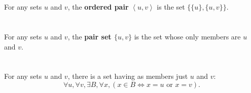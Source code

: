 \documentclass{report}
\newcommand{\pair}[1]{\left< #1 \right>}
\begin{document}
\begin{definition}


\end{definition}

\section{}%

For any sets $u$ and $v$, the \textbf{ordered pair} $\pair{u, v}$ is
  the set $\{\{u\}, \{u, v\}\}$.

\begin{definition}

  \statementpadding



\end{definition}

\section{}%

For any sets $u$ and $v$, the \textbf{pair set $\{u, v\}$} is the set whose
  only members are $u$ and $v$.

\begin{definition}

  \statementpadding



\end{definition}

\section{}%

For any sets $u$ and $v$, there is a set having as members just $u$ and $v$:
  $$\forall u, \forall v, \exists B, \forall x,
      (x \in B \iff x = u \text{ or } x = v).$$

\begin{axiom}

  \statementpadding



\end{axiom}
\end{document}
